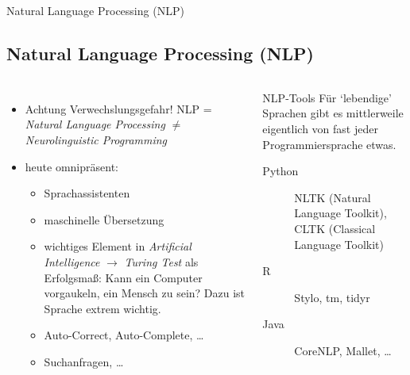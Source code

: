 \begin{frame}{Natural Language Processing (NLP)}
\subsection{Natural Language Processing (NLP)}

\begin{columns}
\begin{itemize}
\item \alert{Achtung Verwechslungsgefahr!} NLP = \emph{Natural Language Processing} $\neq$ \emph{Neurolinguistic Programming}
\item heute omnipräsent: 
\begin{itemize}\footnotesize
\item Sprachassistenten
\item maschinelle Übersetzung
\item wichtiges Element in \emph{Artificial Intelligence} $\to$ \emph{Turing Test} als Erfolgsmaß: Kann ein Computer vorgaukeln, ein Mensch zu sein? Dazu ist Sprache extrem wichtig.
\item Auto-Correct, Auto-Complete, \dots
\item Suchanfragen, \dots
\end{itemize}
\end{itemize}

\scriptsize
\begin{block}{NLP-Tools}
Für `lebendige' Sprachen gibt es mittlerweile eigentlich von fast jeder Programmiersprache etwas.
\begin{description}
\item[Python] NLTK (Natural Language Toolkit), CLTK (Classical Language Toolkit)
\item[R] Stylo, tm, tidyr
\item[Java] CoreNLP, Mallet, \dots
\end{description}
\end{block}

\end{columns}

\end{frame}




